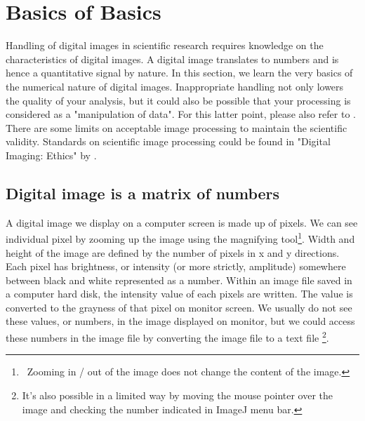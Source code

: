 
\section{Basics of Basics}

Handling of digital images in scientific research requires knowledge on
the characteristics of digital images. A digital image translates to numbers and is hence a quantitative signal by nature. In this section, we learn the very basics of the numerical nature of digital images. Inappropriate handling not
only lowers the quality of your analysis, but it could also be possible
that your processing is considered as a "manipulation
of data". For this latter point, please also refer to
\citet{Rossner2004}. There are some limits on acceptable image processing
to maintain the scientific validity. Standards on scientific image
processing could be found in "Digital Imaging:
Ethics" by \citet{cromey2007}. 

\subsection{Digital image is a matrix of numbers}
\label{subsec:imageEQmatrix}
A digital image we display on a computer screen is made up of pixels. We can see
individual pixel by zooming up the image using the magnifying tool\footnote{\
Zooming in / out of the image does not change the content of the image.}. Width
and height of the image are defined by the number of pixels in x and y
directions. Each pixel has brightness, or intensity (or more strictly,
amplitude) somewhere between black and white represented as a number. Within
an image file saved in a computer hard disk, the intensity value of each pixels are written. The value is converted to the grayness of that pixel on monitor screen.
We usually do not see these values, or numbers, in the image displayed on
monitor, but we could access these numbers in the image file by converting 
the image file to a text file \footnote{It's also possible in a limited way by
moving the mouse pointer over the image and checking the number indicated in
ImageJ menu bar.}.

